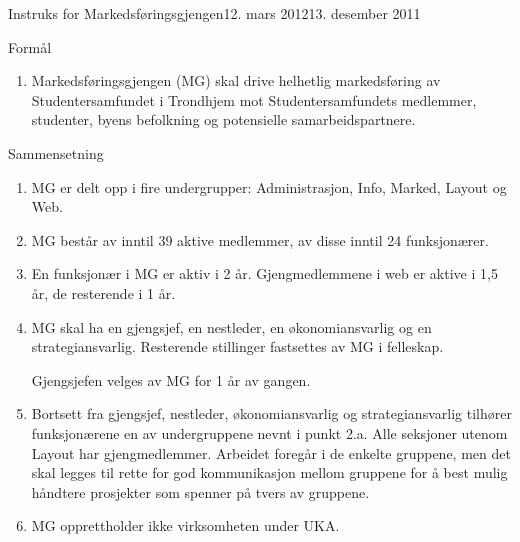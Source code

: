 \documentclass[../../fsbok.tex]{subfiles}
\begin{document}
\begin{instruks}{Instruks for Markedsføringsgjengen}{12. mars 2012}{13. desember 2011 }

    \begin{instruksledd}{Formål}
        \begin{enumerate}
            \item Markedsføringsgjengen (MG) skal drive helhetlig markedsføring av Studentersamfundet
                i Trondhjem mot
                Studentersamfundets medlemmer, studenter, byens befolkning og potensielle samarbeidspartnere.
        \end{enumerate}
    \end{instruksledd}

    \begin{instruksledd}{Sammensetning}
        \begin{enumerate}
            \item MG er delt opp i fire undergrupper: Administrasjon, Info, Marked, Layout og Web.
            \item MG består av inntil 39 aktive medlemmer, av disse inntil 24 funksjonærer.
            \item En funksjonær i MG er aktiv i 2 år. Gjengmedlemmene i web er aktive i 1,5 år, de
                resterende i 1 år.
            \item MG skal ha en gjengsjef, en nestleder, en økonomiansvarlig og en strategiansvarlig. Resterende stillinger fastsettes
                av MG i felleskap.

                Gjengsjefen velges av MG for 1 år av gangen.
            \item Bortsett fra gjengsjef, nestleder, økonomiansvarlig og strategiansvarlig tilhører funksjonærene en av undergruppene nevnt i punkt 2.a.
                Alle
                seksjoner utenom Layout har gjengmedlemmer. Arbeidet foregår i de enkelte gruppene, men det skal
                legges til
                rette for god kommunikasjon mellom gruppene for å best mulig håndtere prosjekter som spenner på
                tvers av
                gruppene.
            \item MG opprettholder ikke virksomheten under UKA.
        \end{enumerate}
    \end{instruksledd}


\end{instruks}
\end{document}
